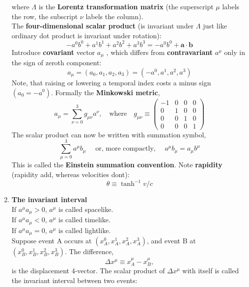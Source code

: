\documentclass[12pt]{book}
\begin{document}
\begin{enumerate}
            where $\Lambda$ is the \textbf{Lorentz transformation matrix} (the superscript $\mu$ labels the row, the subscript $\nu$ labels the column). \\
            The \textbf{four-dimensional scalar product} (is invariant under $\Lambda$ just like ordinary dot product is invariant under rotation): 
            \[ 
            -a^0b^0+a^1b^1+a^2b^2+a^3b^3 = -a^0b^0 + \mathbf{a \cdot b} 
            \]
            Introduce \textbf{covariant} vector $a_{\mu}$ , which differs from \textbf{contravariant}  $a^{\mu}$ only in the sign of zeroth component:
            \[
            a_{\mu}=(a_0, a_1, a_2, a_3)=(-a^0, a^1, a^2, a^3)
            \] Note, that raising or lowering a temporal index costs a minus sign $(a_0=-a^0)$.  Formally the \textbf{Minkowski metric}, 
            \[
            a_{\mu} = \sum_{\nu=0}^{3} g_{\mu\nu} a^\nu , \quad \text{where} \quad g_{\mu\nu} \equiv
            \begin{pmatrix}
            -1 & 0 & 0 & 0 \\
            0 & 1 & 0 & 0 \\
            0 & 0 & 1 & 0 \\
            0 & 0 & 0 & 1
            \end{pmatrix}
            \]
            The scalar product can now be written with summation symbol,
            \[
            \sum_{\mu=0}^{3} a^{\mu} b_\mu \quad \text{ or, more compactly, } \quad a^\mu b_\mu =a_\mu b^\mu
            \]
            This is called the \textbf{Einstein summation convention}. Note \textbf{rapidity} (rapidity add, whereas velocities dont): 
            \[
            \theta \equiv \tanh^{-1}{v/c}
            \]
    
        \item \textbf{The invariant interval}\\
            If \(a^\mu a_\mu > 0\), \(a^\mu\) is called spacelike. \\
            If \(a^\mu a_\mu < 0\), \(a^\mu\) is called timelike. \\
            If \(a^\mu a_\mu = 0\), \(a^\mu\) is called lightlike. \\
            
            Suppose event A occurs at \((x^0_A, x^1_A, x^2_A, x^3_A)\), and event B at \((x^0_B, x^1_B, x^2_B, x^3_B)\).
            The difference,
            \[
            \Delta x^\mu \equiv x^\mu_A - x^\mu_B,
            \]
            is the displacement 4-vector. The scalar product of \(\Delta x^\mu\) with itself is called the invariant interval between two events:
            

\end{enumerate}
\end{document}
